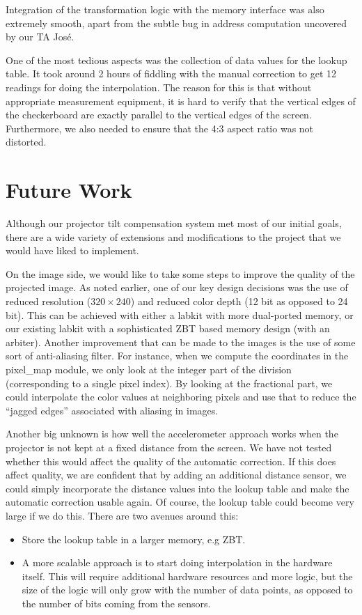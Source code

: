 \documentclass{article}
\begin{document}
Integration of the transformation logic with the memory interface was also extremely smooth,
apart from the subtle bug in address computation uncovered by our TA Jos\'{e}.

One of the most tedious aspects was the collection of data values for the lookup table.
It took around 2 hours of fiddling with the manual correction to get 12 readings for doing the interpolation.
The reason for this is that without appropriate measurement equipment,
it is hard to verify that the vertical edges of the checkerboard are exactly parallel to the vertical edges of the screen.
Furthermore, we also needed to ensure that the 4:3 aspect ratio was not distorted.

\section{Future Work}
Although our projector tilt compensation system met most of our initial goals,
there are a wide variety of extensions and modifications to the project that we would have liked to implement.

On the image side, we would like to take some steps to improve the quality of the projected image.
As noted earlier, one of our key design decisions was the use of reduced resolution ($320 \times 240$) and reduced color depth (12 bit as opposed to 24 bit).
This can be achieved with either a labkit with more dual-ported memory, or our existing labkit with a sophisticated ZBT based memory design (with an arbiter).
Another improvement that can be made to the images is the use of some sort of anti-aliasing filter.
For instance, when we compute the coordinates in the pixel\_map module, we only look at the integer part of the division (corresponding to a single pixel index).
By looking at the fractional part, we could interpolate the color values at neighboring pixels and use that to reduce the ``jagged edges'' associated with aliasing in images.

Another big unknown is how well the accelerometer approach works when the projector is not kept at a fixed distance from the screen.
We have not tested whether this would affect the quality of the automatic correction.
If this does affect quality, we are confident that by adding an additional distance sensor,
we could simply incorporate the distance values into the lookup table and make the automatic correction usable again.
Of course, the lookup table could become very large if we do this.
There are two avenues around this:
\begin{itemize}
    \item Store the lookup table in a larger memory, e.g ZBT.
    \item A more scalable approach is to start doing interpolation in the hardware itself.
        This will require additional hardware resources and more logic,
        but the size of the logic will only grow with the number of data points,
        as opposed to the number of bits coming from the sensors.
\end{itemize}
\end{document}
